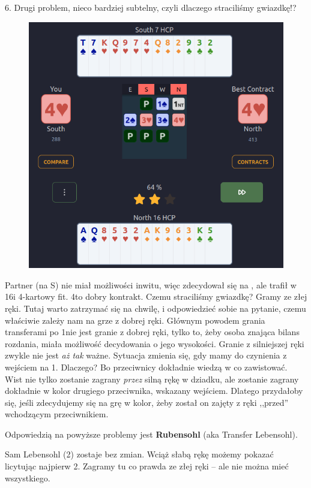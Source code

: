 \documentclass[12pt, a4paper]{article}
\begin{document}
6. Drugi problem, nieco bardziej subtelny, czyli dlaczego straciliśmy gwiazdkę!?

\begin{figure}[H]
    \centering
    \includegraphics[width=0.7\linewidth]{cuebids.png}
\end{figure}

Partner (na S) nie miał możliwości inwitu, więc zdecydował się na \gf, ale trafił w
16\hcp i 4-kartowy fit. 4\hearts to dobry kontrakt. Czemu straciliśmy gwiazdkę? Gramy ze złej ręki.
Tutaj warto zatrzymać się na chwilę, i odpowiedzieć sobie na pytanie, czemu właściwie
zależy nam na grze z dobrej ręki. Głównym powodem grania transferami po 1\nt nie jest granie z dobrej ręki,
tylko to, żeby osoba znająca bilans rozdania, miała możliwość decydowania o jego wysokości.
Granie z silniejszej ręki zwykle nie jest \textit{aż tak} ważne. Sytuacja zmienia się, gdy mamy do czynienia
z wejściem na 1\nt. Dlaczego? Bo przeciwnicy dokładnie wiedzą w co zawistować. Wist nie tylko
zostanie zagrany \textit{przez} silną rękę w dziadku, ale zostanie zagrany dokładnie w kolor drugiego
przeciwnika, wskazany wejściem. Dlatego przydałoby się, jeśli zdecydujemy się na grę w kolor, 
żeby został on zajęty z ręki ,,przed'' wchodzącym przeciwnikiem.

Odpowiedzią na powyższe problemy jest 
\textbf{{\color{red}R}{\color{orange}u}{\color{LimeGreen}b}{\color{cyan}e}{\color{blue}n}{\color{purple}s}{\color{red}o}{\color{orange}h}{\color{LimeGreen}l}} (aka Transfer Lebensohl).

Sam Lebensohl (2\nt) zostaje bez zmian. Wciąż słabą rękę możemy pokazać licytując najpierw 2\nt.
Zagramy tu co prawda ze złej ręki -- ale nie można mieć wszystkiego.
\end{document}
